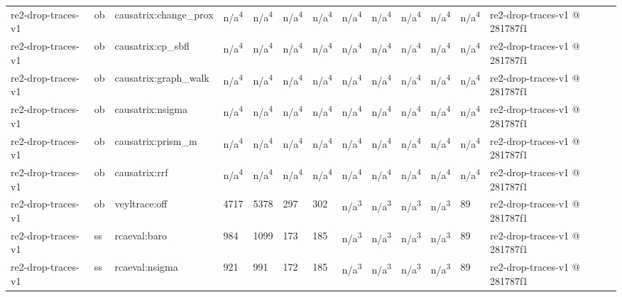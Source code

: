 \begin{table}[t]
\begin{tabular}{lllllllllllll}
re2-drop-traces-v1 & ob & causatrix:change\_prox & n/a\textsuperscript{4} & n/a\textsuperscript{4} & n/a\textsuperscript{4} & n/a\textsuperscript{4} & n/a\textsuperscript{4} & n/a\textsuperscript{4} & n/a\textsuperscript{4} & n/a\textsuperscript{4} & n/a\textsuperscript{4} & re2-drop-traces-v1 @ 281787f1 \\
re2-drop-traces-v1 & ob & causatrix:cp\_sbfl & n/a\textsuperscript{4} & n/a\textsuperscript{4} & n/a\textsuperscript{4} & n/a\textsuperscript{4} & n/a\textsuperscript{4} & n/a\textsuperscript{4} & n/a\textsuperscript{4} & n/a\textsuperscript{4} & n/a\textsuperscript{4} & re2-drop-traces-v1 @ 281787f1 \\
re2-drop-traces-v1 & ob & causatrix:graph\_walk & n/a\textsuperscript{4} & n/a\textsuperscript{4} & n/a\textsuperscript{4} & n/a\textsuperscript{4} & n/a\textsuperscript{4} & n/a\textsuperscript{4} & n/a\textsuperscript{4} & n/a\textsuperscript{4} & n/a\textsuperscript{4} & re2-drop-traces-v1 @ 281787f1 \\
re2-drop-traces-v1 & ob & causatrix:nsigma & n/a\textsuperscript{4} & n/a\textsuperscript{4} & n/a\textsuperscript{4} & n/a\textsuperscript{4} & n/a\textsuperscript{4} & n/a\textsuperscript{4} & n/a\textsuperscript{4} & n/a\textsuperscript{4} & n/a\textsuperscript{4} & re2-drop-traces-v1 @ 281787f1 \\
re2-drop-traces-v1 & ob & causatrix:prism\_m & n/a\textsuperscript{4} & n/a\textsuperscript{4} & n/a\textsuperscript{4} & n/a\textsuperscript{4} & n/a\textsuperscript{4} & n/a\textsuperscript{4} & n/a\textsuperscript{4} & n/a\textsuperscript{4} & n/a\textsuperscript{4} & re2-drop-traces-v1 @ 281787f1 \\
re2-drop-traces-v1 & ob & causatrix:rrf & n/a\textsuperscript{4} & n/a\textsuperscript{4} & n/a\textsuperscript{4} & n/a\textsuperscript{4} & n/a\textsuperscript{4} & n/a\textsuperscript{4} & n/a\textsuperscript{4} & n/a\textsuperscript{4} & n/a\textsuperscript{4} & re2-drop-traces-v1 @ 281787f1 \\
re2-drop-traces-v1 & ob & veyltrace:off & 4717 & 5378 & 297 & 302 & n/a\textsuperscript{3} & n/a\textsuperscript{3} & n/a\textsuperscript{3} & n/a\textsuperscript{3} & 89 & re2-drop-traces-v1 @ 281787f1 \\
re2-drop-traces-v1 & ss & rcaeval:baro & 984 & 1099 & 173 & 185 & n/a\textsuperscript{3} & n/a\textsuperscript{3} & n/a\textsuperscript{3} & n/a\textsuperscript{3} & 89 & re2-drop-traces-v1 @ 281787f1 \\
re2-drop-traces-v1 & ss & rcaeval:nsigma & 921 & 991 & 172 & 185 & n/a\textsuperscript{3} & n/a\textsuperscript{3} & n/a\textsuperscript{3} & n/a\textsuperscript{3} & 89 & re2-drop-traces-v1 @ 281787f1 \\

\end{tabular}
\end{table}
